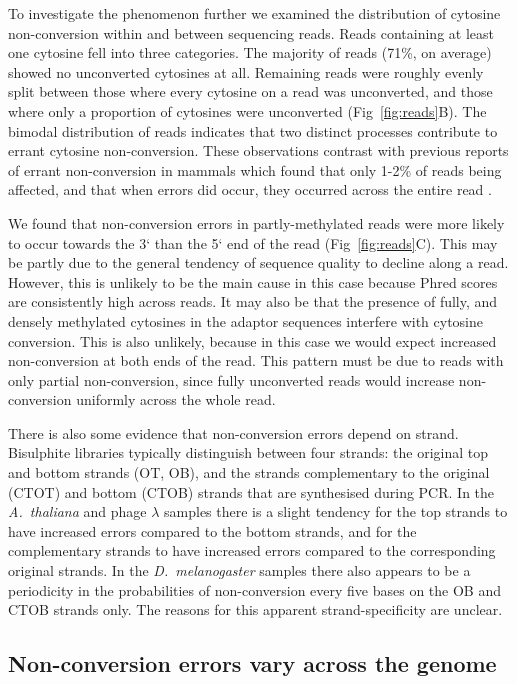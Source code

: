 \documentclass[10pt,letterpaper,draft]{article}
\begin{document}
To investigate the phenomenon further we examined the distribution of cytosine non-conversion within and between sequencing reads.
Reads containing at least one cytosine fell into three categories.
The majority of reads (71\%, on average) showed no unconverted cytosines at all.
Remaining reads were roughly evenly split between those where every cytosine on a read was unconverted, and those where only a proportion of cytosines were unconverted (Fig~\ref{fig:reads}B).
The bimodal distribution of reads indicates that two distinct processes contribute to errant cytosine non-conversion.
These observations contrast with previous reports of errant non-conversion in mammals which found that only 1-2\% of reads being affected, and that when errors did occur, they occurred across the entire read \cite{lu2015improved, suzuki2018whole}.

We found that non-conversion errors in partly-methylated reads were more likely to occur towards the 3` than the 5` end of the read (Fig~\ref{fig:reads}C).
This may be partly due to the general tendency of sequence quality to decline along a read.
However, this is unlikely to be the main cause in this case because Phred scores are consistently high across reads.
It may also be that the presence of fully, and densely methylated cytosines in the adaptor sequences interfere with cytosine conversion.
This is also unlikely, because in this case we would expect increased non-conversion at both ends of the read.
This pattern must be due to reads with only partial non-conversion, since fully unconverted reads would increase non-conversion uniformly across the whole read.

There is also some evidence that non-conversion errors depend on strand.
Bisulphite libraries typically distinguish between four strands: the original top and bottom strands (OT, OB), and the strands complementary to the original (CTOT) and bottom (CTOB) strands that are synthesised during PCR.
In the \emph{A.~thaliana} and phage $\lambda$ samples there is a slight tendency for the top strands to have increased errors compared to the bottom strands, and for the complementary strands to have increased errors compared to the corresponding original strands.
In the \emph{D.~melanogaster} samples there also appears to be a periodicity in the probabilities of non-conversion every five bases on the OB and CTOB strands only.
The reasons for this apparent strand-specificity are unclear.

\subsection*{Non-conversion errors vary across the genome}
\end{document}
